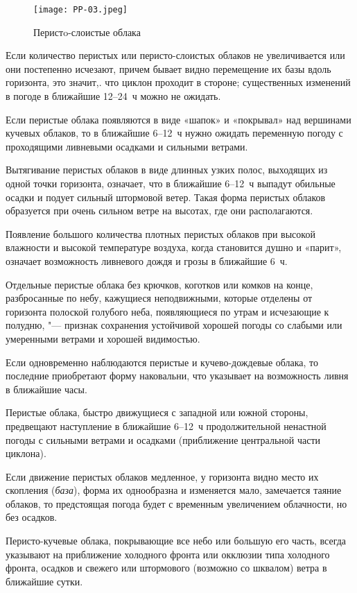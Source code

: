 \begin{figure}[htb]
  \centering{}
  \texttt{[image: PP-03.jpeg]}
  \caption{Перистo-слоистые облака}
  \label{fig:pp03}
  \small
  \centering{}
\end{figure}

 Если количество перистых или перисто-слоистых облаков не
увеличивается или они постепенно исчезают, причем бывает видно
перемещение их базы вдоль горизонта, это значит,. что циклон проходит
в стороне; существенных изменений в погоде в ближайшие 12--24~ч
можно не ожидать.

 Если перистые облака появляются в виде «шапок» и «покрывал» над
вершинами кучевых облаков, то в ближайшие 6--12~ч нужно ожидать
переменную погоду с проходящими ливневыми осадками и сильными ветрами.

 Вытягивание перистых облаков в виде длинных узких полос, выходящих
из одной точки горизонта, означает, что в ближайшие 6--12~ч выпадут
обильные осадки и подует сильный штормовой ветер. Такая форма перистых
облаков образуется при очень сильном ветре на высотах, где они
располагаются.

 Появление большого количества плотных перистых облаков при
высокой влажности и высокой температуре воздуха, когда становится
душно и «парит», означает возможность ливневого дождя и грозы в
ближайшие 6~ч.

 Отдельные перистые облака без крючков, коготков или комков на
конце, разбросанные по небу, кажущиеся неподвижными, которые отделены
от горизонта полоской голубого неба, появляющиеся по утрам и
исчезающие к полудню, "--- признак сохранения устойчивой хорошей погоды
со слабыми или умеренными ветрами и хорошей видимостью.

 Если одновременно наблюдаются перистые и кучево-дождевые
облака, то последние приобретают форму наковальни, что указывает на
возможность ливня в ближайшие часы.

 Перистые облака, быстро движущиеся с западной или южной
стороны, предвещают наступление в ближайшие 6--12~ч продолжительной
ненастной погоды с сильными ветрами и осадками (приближение
центральной части циклона).

 Если движение перистых облаков медленное, у горизонта видно
место их скопления (\textit{база}), форма их однообразна и изменяется мало,
замечается таяние облаков, то предстоящая погода будет с временным
увеличением облачности, но без осадков.

 Перисто-кучевые облака, покрывающие все небо или большую его
часть, всегда указывают на приближение холодного фронта или окклюзии
типа холодного фронта, осадков и свежего или штормового (возможно со
шквалом) ветра в ближайшие сутки.


